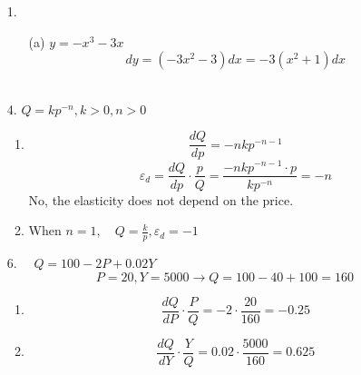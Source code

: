 \documentclass{./../../Latex/homework}
\begin{document}
\begin{enumerate}

\item[1.] \begin{enumerate}
\item[(a)] $y=-x^{3}-3 x$
$$d y=\left(-3 x^{2}-3\right) d x=-3\left(x^{2}+1\right) d x$$ \\
\end{enumerate}

\item[4.] $Q=k p^{-n}, k>0, n>0$ \\
\begin{enumerate}
\item $$\frac{d Q}{d p}=-n k p^{-n-1}$$
$$\varepsilon_{d}=\frac{d Q}{d p} \cdot \frac{p}{Q}=\frac{-n k p^{-n-1} \cdot p}{k p^{-n}}=-n$$
No, the elasticity does not depend on the price. 
\item When $n=1, \quad Q=\frac{k}{p}, \varepsilon_{d}=-1$
\end{enumerate}


\item[6.] $\quad Q=100-2 P+0.02 Y$
$$
P=20, Y=5000 \longrightarrow Q=100-40+100=160
$$
\begin{enumerate}
\item $$\frac{d Q}{d P} \cdot \frac{P}{Q}=-2 \cdot \frac{20}{160}=-0.25$$ 
\item $$\frac{d Q}{d Y} \cdot \frac{Y}{Q}=0.02 \cdot \frac{5000}{160}=0.625$$ \\
\end{enumerate}
\end{enumerate}

\end{document}
